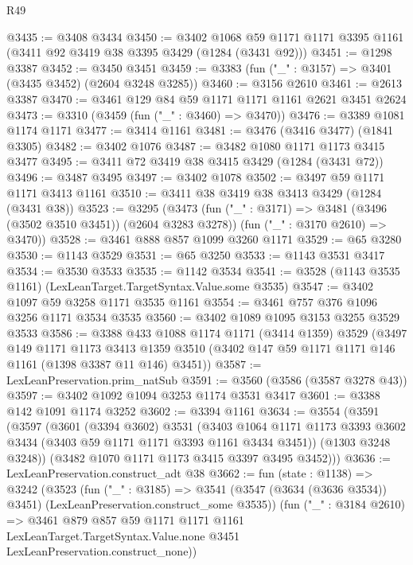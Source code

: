 \begin{lexlean}{R49}
\begin{coremodule}
@3435 := @3408 @3434
@3450 := @3402
    @1068
    @59
    @1171
    @1171
    @3395
    @1161
    (@3411 @92 @3419 @38 @3395 @3429 (@1284 (@3431 @92)))
@3451 := @1298 @3387
@3452 := @3450 @3451
@3459 := @3383 (fun ("_" : @3157) => @3401 (@3435 @3452) (@2604 @3248 @3285))
@3460 := @3156 @2610
@3461 := @2613 @3387
@3470 := @3461 @129 @84 @59 @1171 @1171 @1161 @2621 @3451 @2624
@3473 := @3310 (@3459 (fun ("_" : @3460) => @3470))
@3476 := @3389 @1081 @1174 @1171
@3477 := @3414 @1161
@3481 := @3476 (@3416 @3477) (@1841 @3305)
@3482 := @3402 @1076
@3487 := @3482 @1080 @1171 @1173 @3415 @3477
@3495 := @3411 @72 @3419 @38 @3415 @3429 (@1284 (@3431 @72))
@3496 := @3487 @3495
@3497 := @3402 @1078
@3502 := @3497 @59 @1171 @1171 @3413 @1161
@3510 := @3411 @38 @3419 @38 @3413 @3429 (@1284 (@3431 @38))
@3523 := @3295
    (@3473
      (fun ("_" : @3171) => @3481 (@3496 (@3502 @3510 @3451)) (@2604 @3283 @3278))
      (fun ("_" : @3170 @2610) => @3470))
@3528 := @3461 @888 @857 @1099 @3260 @1171
@3529 := @65 @3280
@3530 := @1143 @3529
@3531 := @65 @3250
@3533 := @1143 @3531 @3417
@3534 := @3530 @3533
@3535 := @1142 @3534
@3541 := @3528 (@1143 @3535 @1161) (LexLeanTarget.TargetSyntax.Value.some @3535)
@3547 := @3402 @1097 @59 @3258 @1171 @3535 @1161
@3554 := @3461 @757 @376 @1096 @3256 @1171 @3534 @3535
@3560 := @3402 @1089 @1095 @3153 @3255 @3529 @3533
@3586 := @3388
    @433
    @1088
    @1174
    @1171
    (@3414 @1359)
    @3529
    (@3497
      @149
      @1171
      @1173
      @3413
      @1359
      @3510
      (@3402 @147 @59 @1171 @1171 @146 @1161 (@1398 @3387 @11 @146) @3451))
@3587 := LexLeanPreservation.prim_natSub
@3591 := @3560 (@3586 (@3587 @3278 @43))
@3597 := @3402 @1092 @1094 @3253 @1174 @3531 @3417
@3601 := @3388 @142 @1091 @1174 @3252
@3602 := @3394 @1161
@3634 := @3554
    (@3591
      (@3597
        (@3601
          (@3394 @3602)
          @3531
          (@3403
            @1064
            @1171
            @1173
            @3393
            @3602
            @3434
            (@3403 @59 @1171 @1171 @3393 @1161 @3434 @3451))
          (@1303 @3248 @3248))
        (@3482 @1070 @1171 @1173 @3415 @3397 @3495 @3452)))
@3636 := LexLeanPreservation.construct_adt @38
@3662 := fun (state : @1138) =>
  @3242
    (@3523
      (fun ("_" : @3185) =>
      @3541 (@3547 (@3634 (@3636 @3534)) @3451) (LexLeanPreservation.construct_some @3535))
      (fun ("_" : @3184 @2610) =>
      @3461
        @879
        @857
        @59
        @1171
        @1171
        @1161
        LexLeanTarget.TargetSyntax.Value.none
        @3451
        LexLeanPreservation.construct_none))

\end{coremodule}
\end{lexlean}
